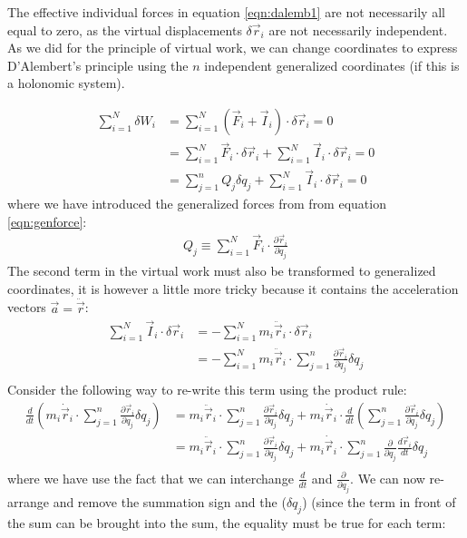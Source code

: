 The effective individual forces in equation \ref{eqn:dalemb1} are not necessarily all equal to zero, as the virtual displacements $\delta\vec{r}_i$ are not necessarily independent. As we did for the principle of virtual work, we can change coordinates to express D'Alembert's principle using the $n$ independent generalized coordinates (if this is a holonomic system).

\begin{align}
\sum_{i=1}^N\delta W_i&= \sum_{i=1}^N (\vec{F}_i+\vec{I}_i)\cdot\delta\vec{r}_i=0\nonumber\\
&=\sum_{i=1}^N \vec{F}_i\cdot\delta\vec{r}_i+\sum_{i=1}^N \vec{I}_i\cdot\delta\vec{r}_i=0\nonumber\\
&=\sum_{j=1}^nQ_j\delta q_j+\sum_{i=1}^N \vec{I}_i\cdot\delta\vec{r}_i=0
\end{align}
where we have introduced the generalized forces from from equation \ref{eqn:genforce}:
\begin{align}
Q_j\equiv \sum_{i=1}^N\vec{F}_i\cdot\frac{\partial\vec{r}_i}{\partial q_j}
\end{align}
The second term in the virtual work must also be transformed to generalized coordinates, it is however a little more tricky because it contains the acceleration vectors $\vec{a}=\ddot{\vec{r}}$:
\begin{align}
\sum_{i=1}^N \vec{I}_i\cdot\delta\vec{r}_i&=-\sum_{i=1}^N m_i\ddot{\vec{r}}_i\cdot\delta\vec{r}_i\nonumber\\
&=-\sum_{i=1}^N m_i\ddot{\vec{r}}_i\cdot\sum_{j=1}^n\frac{\partial\vec{r}_i}{\partial q_j}\delta q_j   \nonumber\\
\label{eqn:dalemb2}
\end{align}
Consider the following way to re-write this term using the product rule:
\begin{align}
\frac{d}{dt}\left(m_i\dot{\vec{r}}_i\cdot\sum_{j=1}^n\frac{\partial\vec{r}_i}{\partial q_j}\delta q_j \right)&=m_i\ddot{\vec{r}}_i\cdot\sum_{j=1}^n\frac{\partial\vec{r}_i}{\partial q_j}\delta q_j + m_i\dot{\vec{r}}_i\cdot\frac{d}{dt}\left(\sum_{j=1}^n\frac{\partial\vec{r}_i}{\partial q_j}\delta q_j \right)\nonumber\\
&=m_i\ddot{\vec{r}}_i\cdot\sum_{j=1}^n\frac{\partial\vec{r}_i}{\partial q_j}\delta q_j + m_i\dot{\vec{r}}_i\cdot\sum_{j=1}^n\frac{\partial}{\partial q_j}\frac{d\vec{r}_i}{dt}\delta q_j \nonumber\\
\end{align}
where we have use the fact that we can interchange $\frac{d}{dt}$ and $\frac{\partial}{\partial q_j}$. We can now re-arrange and remove the summation sign and the ($\delta q_j$) (since the term in front of the sum can be brought into the sum, the equality must be true for each term:
